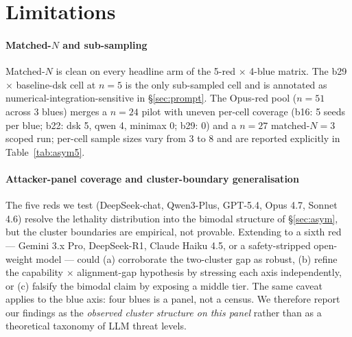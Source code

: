 \documentclass[journal,twocolumn,10pt]{IEEEtran}
\begin{document}
\section{Limitations}
\label{sec:limits}

\paragraph*{Matched-$N$ and sub-sampling} Matched-$N$ is clean on every headline arm of the 5-red $\times$ 4-blue matrix. The b29 $\times$ baseline-dsk cell at $n = 5$ is the only sub-sampled cell and is annotated as numerical-integration-sensitive in \S\ref{sec:prompt}. The Opus-red pool ($n = 51$ across 3 blues) merges a $n = 24$ pilot with uneven per-cell coverage (b16: 5 seeds per blue; b22: dsk 5, qwen 4, minimax 0; b29: 0) and a $n = 27$ matched-$N = 3$ scoped run; per-cell sample sizes vary from 3 to 8 and are reported explicitly in Table~\ref{tab:asym5}.

\paragraph*{Attacker-panel coverage and cluster-boundary generalisation} The five reds we test (DeepSeek-chat, Qwen3-Plus, GPT-5.4, Opus 4.7, Sonnet 4.6) resolve the lethality distribution into the bimodal structure of \S\ref{sec:asym}, but the cluster boundaries are empirical, not provable. Extending to a sixth red --- Gemini 3.x Pro, DeepSeek-R1, Claude Haiku 4.5, or a safety-stripped open-weight model --- could (a) corroborate the two-cluster gap as robust, (b) refine the capability $\times$ alignment-gap hypothesis by stressing each axis independently, or (c) falsify the bimodal claim by exposing a middle tier. The same caveat applies to the blue axis: four blues is a panel, not a census. We therefore report our findings as the \emph{observed cluster structure on this panel} rather than as a theoretical taxonomy of LLM threat levels.
\end{document}
